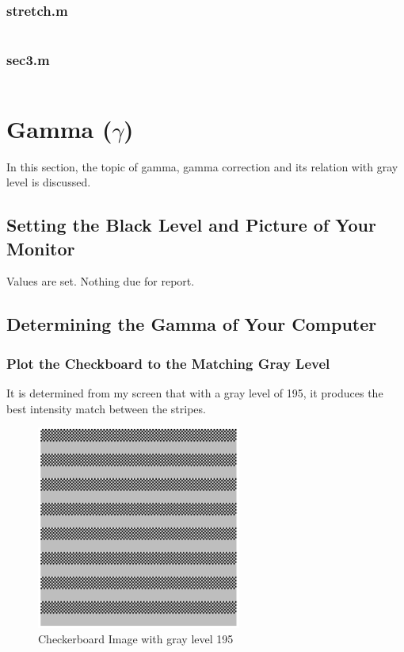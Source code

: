 \documentclass{article}
\begin{document}
	\subsubsection{stretch.m}
		\inputminted[tabsize=4,breaklines]{matlab}{stretch.m}
	\subsubsection{sec3.m}
		\inputminted[tabsize=4,breaklines]{matlab}{sec3.m}

\section{Gamma ($\gamma$)}
	In this section, the topic of gamma, gamma correction and its relation with
	gray level is discussed.

\subsection{Setting the Black Level and Picture of Your Monitor}
	Values are set. Nothing due for report.

\subsection{Determining the Gamma of Your Computer}
	\subsubsection{Plot the Checkboard to the Matching Gray Level}
		It is determined from my screen that with a gray level of 195, it
		produces the best intensity match between the stripes.

		\begin{figure}[h]
			\begin{center}
				\includegraphics[width=0.6\textwidth]{checker.png}
				\caption{Checkerboard Image with gray level 195}
			\end{center}
		\end{figure}
\end{document}
